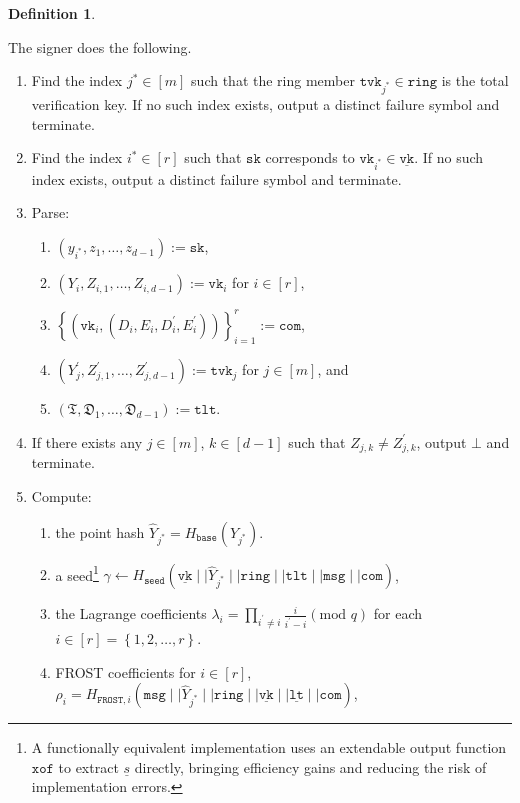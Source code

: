 \documentclass[11pt]{article}
\theoremstyle{definition}
\newtheorem{definition}[definition]{Definition}
\newcommand{\sk}{\texttt{sk}}
\newcommand{\vk}{\texttt{vk}}
\newcommand{\tlt}{\texttt{tlt}}
\newcommand{\tvk}{\texttt{tvk}}
\newcommand{\ring}{\texttt{ring}}
\newcommand{\VK}{\underline{\texttt{vk}}}
\newcommand{\LT}{\underline{\texttt{lt}}}
\newcommand{\seed}{\texttt{seed}}
\newcommand{\com}{\texttt{com}}
\newcommand{\msg}{\texttt{msg}}
\newcommand{\FROST}{\texttt{FROST}}
\begin{document}
\begin{definition}
\begin{enumerate}
The signer does the following.
\begin{enumerate}
\item  Find the index $j^* \in [m]$ such that the ring member $\tvk_{j^*} \in \ring$ is the total verification key. If no such index exists, output a distinct failure symbol and terminate.
\item Find the index $i^* \in [r]$ such that $\sk$ corresponds to $\vk_{i^*} \in \VK$. If no such index exists, output a distinct failure symbol and terminate.
\item Parse:
\begin{enumerate}
\item $(y_{i^*}, z_1, \ldots, z_{d-1}) := \sk$, 
\item $(Y_i, Z_{i,1}, \ldots, Z_{i,d-1}) := \vk_i$ for $i \in [r]$,
\item $\left\{(\vk_i, (D_i, E_i, D_i^\prime, E_i^\prime))\right\}_{i=1}^{r} := \texttt{com}$, 
\item $(Y^\prime_j, Z_{j,1}^\prime, \ldots, Z_{j,d-1}^\prime) := \tvk_j$ for $j \in [m]$, and
\item $(\mathfrak{T}, \mathfrak{D}_1, \ldots, \mathfrak{D}_{d-1}) := \tlt$.
\end{enumerate}

\item If there exists any $j \in [m]$, $k \in [d-1]$ such that $Z_{j,k} \neq Z^\prime_{j,k}$, output $\bot$ and terminate.


\item Compute:
\begin{enumerate}
\item the point hash $\widehat{Y}_{j^*} = H_{\texttt{base}}(Y_{j^*})$.
\item a seed\footnote{A functionally equivalent implementation uses an extendable output function $\texttt{xof}$ to extract $\underline{s}$ directly, bringing efficiency gains and reducing the risk of implementation errors.} $\gamma \leftarrow H_{\seed}(\VK \mid \mid \widehat{Y}_{j^*} \mid \mid \ring \mid \mid \tlt \mid \mid \msg \mid \mid \texttt{com})$, 
\item the Lagrange coefficients $\lambda_i = \prod_{i^\prime \neq i} \frac{i}{i^\prime-i} (\text{mod }q)$ for each $i \in [r] = \left\{1,2,\ldots,r\right\}$.
\item FROST coefficients for $i \in [r]$, $\rho_i = H_{\FROST,i}(\msg \mid \mid \widehat{Y}_{j^*} \mid \mid \ring \mid \mid \VK \mid \mid \LT \mid \mid \com)$,




\end{enumerate}
\end{enumerate}
\end{enumerate}
\end{definition}
\end{document}
